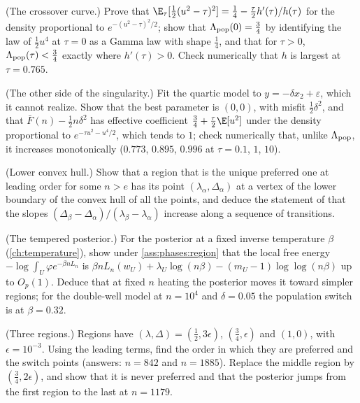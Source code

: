\begin{refsection}
\begin{exercises}
\item \consolidation (The crossover curve.) Prove that $\E_\tau[\frac12(u^2-\tau)^2]=\frac14-\frac\tau2h'(\tau)/h(\tau)$ for the density proportional to $e^{-(u^2-\tau)^2/2}$; show that $\Lambda_{\mathrm{pop}}(0)=\frac34$ by identifying the law of $\frac12u^4$ at $\tau=0$ as a Gamma law with shape $\frac14$, and that for $\tau>0$, $\Lambda_{\mathrm{pop}}(\tau)<\frac34$ exactly where $h'(\tau)>0$. Check numerically that $h$ is largest at $\tau=0.765$.\label{ex:phases:curve}

\item \consolidation (The other side of the singularity.) Fit the quartic model to $y=-\delta x_2+\varepsilon$, which it cannot realize. Show that the best parameter is $(0,0)$, with misfit $\frac12\delta^2$, and that $\bar F(n)-\frac12n\delta^2$ has effective coefficient $\frac34+\frac\tau2\E[u^2]$ under the density proportional to $e^{-\tau u^2-u^4/2}$, which tends to $1$; check numerically that, unlike $\Lambda_{\mathrm{pop}}$, it increases monotonically ($0.773$, $0.895$, $0.996$ at $\tau=0.1$, $1$, $10$).\label{ex:phases:otherside}

\item \consolidation (Lower convex hull.) Show that a region that is the unique preferred one at leading order for some $n>e$ has its point $(\lambda_\alpha,\Delta_\alpha)$ at a vertex of the lower boundary of the convex hull of all the points, and deduce the statement of \textcite[App.~C.4]{ChenEtAl2023} that the slopes $(\Delta_\beta-\Delta_\alpha)/(\lambda_\beta-\lambda_\alpha)$ increase along a sequence of transitions.\label{ex:phases:hull}

\item \consolidation (The tempered posterior.) For the posterior at a fixed inverse temperature $\beta$ (\cref{ch:temperature}), show under \cref{ass:phases:region} that the local free energy $-\log\int_U\varphi e^{-\beta nL_n}$ is $\beta nL_n(w_U)+\lambda_U\log(n\beta)-(m_U-1)\log\log(n\beta)$ up to $O_p(1)$. Deduce that at fixed $n$ heating the posterior moves it toward simpler regions; for the double-well model at $n=10^4$ and $\delta=0.05$ the population switch is at $\beta=0.32$.\label{ex:phases:beta}

\item \byhand (Three regions.) Regions have $(\lambda,\Delta)=(\frac12,3\epsilon)$, $(\frac34,\epsilon)$ and $(1,0)$, with $\epsilon=10^{-3}$. Using the leading terms, find the order in which they are preferred and the switch points (answers: $n=842$ and $n=1885$). Replace the middle region by $(\frac34,2\epsilon)$, and show that it is never preferred and that the posterior jumps from the first region to the last at $n=1179$.\label{ex:phases:three}


\end{exercises}
\end{refsection}

